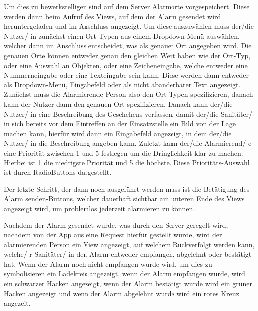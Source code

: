     \noindent Um dies zu bewerkstelligen sind auf dem Server Alarmorte vorgespeichert. Diese werden dann beim Aufruf des Views, auf dem der Alarm gesendet wird heruntergeladen
    und im Anschluss angezeigt.
    Um diese auszuwählen muss der/die Nutzer/-in zunächst einen Ort-Typen aus einem Dropdown-Menü auswählen, welcher dann im Anschluss entscheidet, was als genauer Ort angegeben wird. 
    Die genauen Orte können entweder genau den gleichen Wert haben wie der Ort-Typ, oder eine Auswahl an Objekten, oder eine Zeicheneingabe, welche entweder eine Nummerneingabe
    oder eine Texteingabe sein kann. Diese werden dann entweder als Dropdown-Menü, Eingabefeld oder als nicht abänderbarer Text angezeigt.
    Zunächst muss die Alarmierende Person also den Ort-Typen spezifizieren, danach kann der Nutzer dann den genauen Ort spezifizieren.
    Danach kann der/die Nutzer/-in eine Beschreibung des Geschehens verfassen, damit der/die Sanitäter/-in sich bereits vor dem Eintreffen an der Einsatzstelle
    ein Bild von der Lage machen kann, hierfür wird dann ein Eingabefeld angezeigt, in dem der/die Nutzer/-in die Beschreibung angeben kann. 
    Zuletzt kann der/die Alarmierend/-e eine Priorität zwischen 1 und 5 festlegen um die Dringlichkeit klar zu machen.
    Hierbei ist 1 die niedrigste Priorität und 5 die höchste.
    Diese Prioritäts-Auswahl ist durch RadioButtons dargestellt.

    \noindent Der letzte Schritt, der dann noch ausgeführt werden muss ist die Betätigung des \glqq Alarm senden\grqq-Buttons, welcher dauerhaft sichtbar am unteren Ende des Views angezeigt wird, um problemlos jederzeit alarmieren zu können.

    \noindent Nachdem der Alarm gesendet wurde, was durch den Server geregelt wird, nachdem von der App aus eine Request hierfür gestellt wurde, wird der alarmierenden Person ein 
    View angezeigt, auf welchem Rückverfolgt werden kann, welche/-r Sanitäter/-in den Alarm entweder empfangen, abgelehnt oder bestätigt hat.
    Wenn der Alarm noch nicht empfangen wurde wird, um dies zu symbolisieren ein Ladekreis angezeigt, wenn der Alarm empfangen wurde, wird ein schwarzer Hacken
    angezeigt, wenn der Alarm bestätigt wurde wird ein grüner Hacken angezeigt und wenn der Alarm abgelehnt wurde wird ein rotes Kreuz angezeit.

